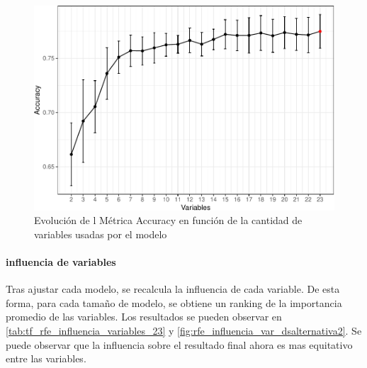\begin{figure}[!htb]
	\centering
	\includegraphics{imagenes/variables/rfe_evolucion_accuracy-1_alternativa2.pdf}
	\caption{Evolución de l Métrica Accuracy en función de la cantidad de variables usadas por el modelo}
	\label{fig:rfe_evolucion_accuracy_datasetAlternativa2}
\end{figure}

\paragraph{influencia de variables}
Tras ajustar cada modelo, se recalcula la influencia de cada variable.
De esta forma, para cada tamaño de modelo, se obtiene un ranking de la
importancia promedio de las variables. Los resultados se pueden observar en \ref{tab:tf_rfe_influencia_variables_23} y \ref{fig:rfe_influencia_var_dsalternativa2}. Se puede observar que la influencia sobre el resultado final ahora es mas equitativo entre las variables.


